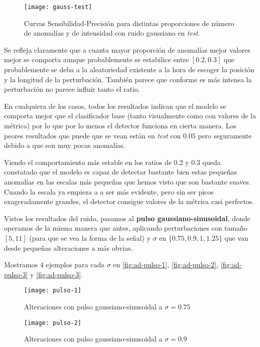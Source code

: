 \begin{figure}[htpb]
  \centering
  \texttt{[image: gauss-test]}
  \caption{Curvas Sensibilidad-Precisión para distintas proporciones de número de anomalías y de intensidad con ruido gaussiano en \emph{test}.}
  \label{fig:ad-gauss-test}
\end{figure}

Se refleja claramente que a cuanta mayor proporción de anomalías mejor valores mejor se comporta aunque probablemente se estabilice entre $[0.2, 0.3]$ que probablemente se deba a la aleatoriedad existente a la hora de escoger la posición y la longitud de la perturbación. También parece que conforme es más intensa la perturbación no parece influir tanto el ratio.

En cualquiera de los casos, todos los resultados indican que el modelo se comporta mejor que el clasificador base (tanto visualmente como con valores de la métrica) por lo que por lo menos el detector funciona en cierta manera. Los peores resultados que puede que se vean están en \emph{test} con $0.05$ pero seguramente debido a que son muy pocas anomalías.

Viendo el comportamiento más estable en los ratios de $0.2$ y $0.3$ queda constatado que el modelo es capaz de detectar bastante bien estas pequeñas anomalías en las escalas más pequeñas que hemos visto que son bastante suaves. Cuando la escala ya empieza a a ser más evidente, pero sin ser picos exageradamente grandes, el detector consigue valores de la métrica casi perfectos.

Vistos los resultados del ruido, pasamos al \textbf{pulso gaussiano-sinusoidal}, donde operamos de la misma manera que antes, aplicando perturbaciones con tamaño $[5, 11]$ (para que se vea la forma de la señal) y $\sigma$ en $\{0.75, 0.9, 1, 1.25\}$ que van desde pequeñas alteraciones a más obvias.

Mostramos 4 ejemplos para cada $\sigma$ en \autoref{fig:ad-pulso-1}, \autoref{fig:ad-pulso-2}, \autoref{fig:ad-pulso-3} y \autoref{fig:ad-pulso-3}.

\begin{figure}[htpb]
  \centering
  \texttt{[image: pulso-1]}
  \caption{Alteraciones con pulso gaussiano-sinusoidal a $\sigma = 0.75$}
  \label{fig:ad-pulso-1}
\end{figure}

\begin{figure}[htpb]
  \centering
  \texttt{[image: pulso-2]}
  \caption{Alteraciones con pulso gaussiano-sinusoidal a $\sigma = 0.9$}
  \label{fig:ad-pulso-2}
\end{figure}

